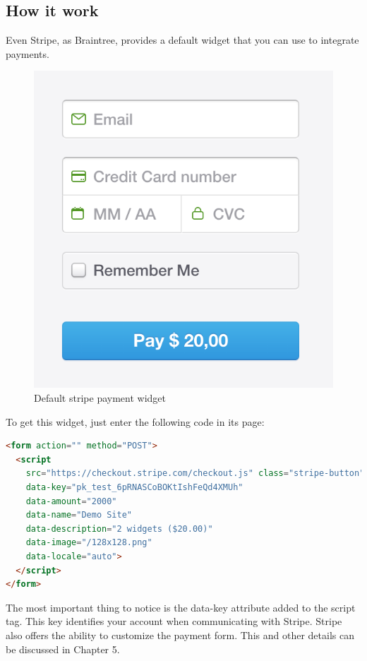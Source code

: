 \subsection{How it work}
Even Stripe, as Braintree, provides a default widget that you can use to integrate payments.
\begin{figure}[htb]
  \centering
  \includegraphics[width=0.5\linewidth]{images/chapter2/stripe-drop.png}\hfill
  \caption[Default stripe payment widget]{Default stripe payment widget}
\label{fig:stripe_default_ui}
\end{figure}
To get this widget, just enter the following code in its page:
\begin{lstlisting}[language=html]
<form action="" method="POST">
  <script
    src="https://checkout.stripe.com/checkout.js" class="stripe-button"
    data-key="pk_test_6pRNASCoBOKtIshFeQd4XMUh"
    data-amount="2000"
    data-name="Demo Site"
    data-description="2 widgets ($20.00)"
    data-image="/128x128.png"
    data-locale="auto">
  </script>
</form>
\end{lstlisting}
The most important thing to notice is the data-key attribute added to the script tag. This key identifies your account when communicating with Stripe.
\newline
Stripe also offers the ability to customize the payment form. This and other details can be discussed in Chapter 5.